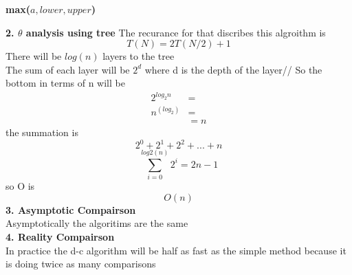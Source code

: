 \documentclass[11pt]{article}
\begin{document}
	\begin{algorithm}[H]
		\NoCaptionOfAlgo
		\caption{\bf max($a, lower, upper$)}
		
	\end{algorithm}
	{\bf 2. $\theta$ analysis using tree}
	The recurance for that discribes this algroithm is
	$$T(N)=2T(N/2) + 1$$
	There will be $log(n)$ layers to the tree\\
	The sum of each layer will be $2^d$ where d is the depth of the layer//
	So the bottom in terms of n will be 
	\begin{align*}
	2^{log_{2}n} &=\\
	n^{(log_{2})} &=\\
	&=n
	\end{align*}
	the summation is
	$$2^0+2^1+2^2+ ... +n$$
	$$\sum\limits_{i=0}^{log{2}(n)} 2^i = 2n-1$$
	so O is 
	$$O(n)$$
	{\bf 3. Asymptotic Compairson}\\
	Asymptotically the algoritims are the same\\
	{\bf 4. Reality Compairson}\\
	In practice the d-c algorithm will be half as fast as the simple method
	because it is doing twice as many comparisons
	
	\newpage
	
\end{document}
